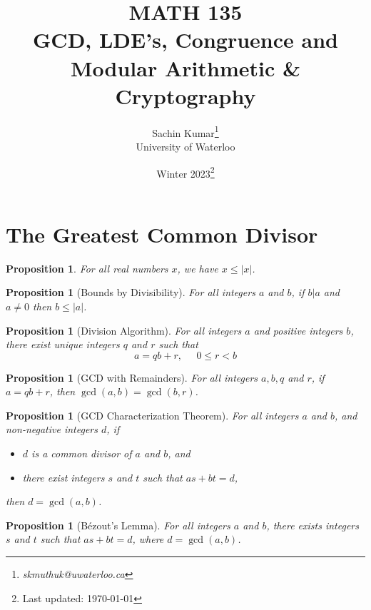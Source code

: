 \documentclass[10pt]{article}
\theoremstyle{break}
\newtheorem{prop}[thm]{Proposition}
\newcommand{\subject}{MATH 135 \\ GCD, LDE's, Congruence and Modular Arithmetic \& Cryptography}
\newcommand{\semester}{Winter 2023}
\begin{document}
\let\ref\Cref

\title{\subject}
\author{Sachin Kumar\thanks{\itshape skmuthuk@uwaterloo.ca}\\ University of Waterloo}
\date{\semester\thanks{Last updated: \today}}

\maketitle
\newpage
\tableofcontents
\newpage


\section{The Greatest Common Divisor}

\begin{prop}
For all real numbers $x$, we have $x \le |x|$.
\end{prop}

\begin{prop}[Bounds by Divisibility]
For all integers $a$ and $b$, if $b | a$ and $a \ne 0$ then $b \le |a|$.
\end{prop}

\begin{prop}[Division Algorithm]
For all integers $a$ and positive integers $b$, there exist unique integers $q$ and $r$ such that $$a=qb + r, \; \; \; \; \; 0 \le r < b$$
\end{prop}

\begin{prop}[GCD with Remainders]
For all integers $a, b, q$ and $r$, if $a = qb + r$, then $\gcd(a,b) = \gcd(b,r)$.
\end{prop}

\begin{prop}[GCD Characterization Theorem]
For all integers $a$ and $b$, and non-negative integers $d$, if 
\begin{itemize}
    \item $d$ is a common divisor of $a$ and $b$, and
    \item there exist integers $s$ and $t$ such that $as + bt = d$,
\end{itemize}
then $d = \gcd(a,b)$.
\end{prop}

\begin{prop}[Bézout's Lemma]
For all integers $a$ and $b$, there exists integers $s$ and $t$ such that $as + bt = d$, where $d = \gcd(a,b)$.
\end{prop}
\end{document}
